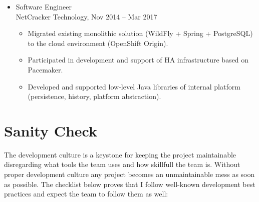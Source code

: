 \documentclass[letterpaper, 11pt]{article}
\begin{document}
\begin{itemize}
        \item
            Software Engineer \\
            \footnotesize
                NetCracker Technology, Nov 2014 -- Mar 2017
            \normalsize

            \begin{itemize}
                \item
                    Migrated existing monolithic solution (WildFly + Spring + PostgreSQL) to the cloud environment (OpenShift Origin).
                \item
                    Participated in development and support of HA infrastructure based on Pacemaker.
                \item
                    Developed and supported low-level Java libraries of internal platform (persistence, history, platform abstraction).
            \end{itemize}
    \end{itemize}





    \section{Sanity Check}

    \renewcommand{\labelitemi}{\checkmark}

    The development culture is a keystone for keeping the project maintainable disregarding what tools the team uses and how skillfull the team is. Without proper development culture any project becomes an unmaintainable mess as soon as possible. The checklist below proves that I follow well-known development best practices and expect the team to follow them as well:
\end{document}
